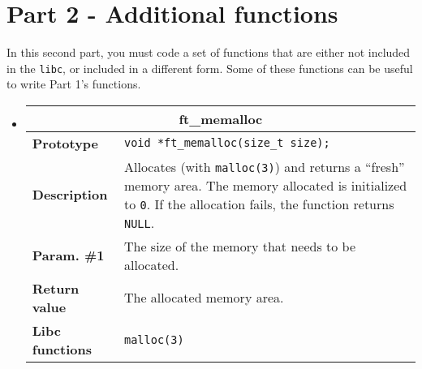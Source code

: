 \documentclass{42-en}
\begin{document}
    \newpage
    \section{Part 2 - Additional functions}

        In this second part, you must code a set of functions that are
        either not included in the \texttt{libc}, or included in a
        different form. Some of these functions can be useful to write
        Part 1's functions.\\

    \begin{itemize}\itemsep1pt

            \item \begin{tabular}{|l|p{11cm}|}
                \hline
                \multicolumn{2}{|c|}{\textbf{ft\_memalloc}}\\
                \hline
                \textbf{Prototype} & \texttt{void
                  *\hspace{5mm}ft\_memalloc(size\_t size);}\\
                \hline
                \textbf{Description} & Allocates (with
                \texttt{malloc(3)}) and returns a ``fresh'' memory area.
                The memory allocated is initialized to \texttt{0}.
                If the allocation fails, the function returns \texttt{NULL}.\\
                \hline
                \textbf{Param. \#1} & The size of the memory that
                needs to be allocated.\\
                \hline
                \textbf{Return value} & The allocated memory area.\\
                \hline
                \textbf{Libc functions} & \texttt{malloc(3)}\\
                \hline
            \end{tabular}


\end{itemize}
\end{document}
